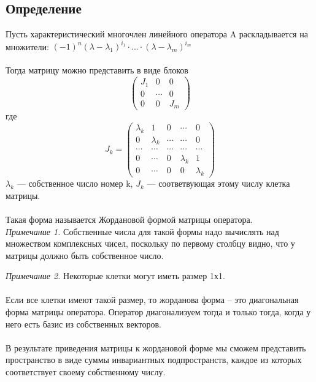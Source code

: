 \documentclass[12pt]{article}
\begin{document}
\subsection{Определение}

Пусть характеристический многочлен линейного оператора A раскладывается на множители:
\((-1)^n(\lambda-\lambda_1)^{i_1}\cdot...\cdot(\lambda-\lambda_m)^{i_m}\)\\\\
Тогда матрицу можно представить в виде блоков
\[
    \begin{pmatrix}
        J_1 & 0      & 0   \\
        0   & \cdots & 0   \\
        0   & 0      & J_m
    \end{pmatrix}
\] где
\[
    J_k = \begin{pmatrix}
        \lambda_k & 1         & 0      & \cdots    & 0         \\
        0         & \lambda_k & \cdots & \cdots    & 0         \\
        \cdots    & \cdots    & \cdots & \cdots    & \cdots    \\
        0         & \cdots    & 0      & \lambda_k & 1         \\
        0         & \cdots    & 0      & 0         & \lambda_k
    \end{pmatrix}
\]
$\lambda_k$ --- собственное число номер k, $J_k$ --- соответвующая этому числу клетка матрицы.\\\\
Такая форма называется Жордановой формой матрицы оператора. \\

\textit{Примечание 1.} Собственные числа для такой формы надо вычислять над множеством комплексных чисел,
поскольку по первому столбцу видно, что у матрицы должно быть собственное число.

\textit{Примечание 2.} Некоторые клетки могут иметь размер 1х1. \\\\
Если все клетки имеют такой размер, то жорданова форма – это диагональная форма матрицы оператора.
Оператор диагонализуем тогда и только тогда, когда у него есть базис из собственных векторов. \\\\
В результате приведения матрицы к жордановой форме мы сможем представить пространство в виде суммы
инвариантных подпространств, каждое из которых соответствует своему собственному числу.
\end{document}
